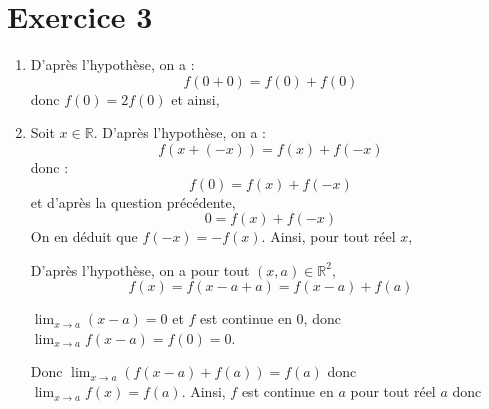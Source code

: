 \documentclass[a4paper,twoside,french,10pt]{VcCours}
\begin{document}
\medskip

\section*{Exercice 3}
\begin{enumerate}
\item D'après l'hypothèse, on a :
$$ f(0+0)=f(0)+f(0)$$
donc $f(0)=2f(0)$ et ainsi,
\item Soit $x \in \mathbb{R}$. D'après l'hypothèse, on a :
$$ f(x+(-x))=f(x)+f(-x)$$
donc :
$$ f(0) = f(x)+f(-x)$$
et d'après la question précédente,
$$ 0=f(x)+f(-x)$$
On en déduit que $f(-x)=-f(x)$. Ainsi, pour tout réel $x$,

D'après l'hypothèse, on a pour tout $(x, a) \in \mathbb{R}^2$,
$$ f(x)=f(x-a+a)=f(x-a)+f(a)$$

$\lim_{x\to a}(x-a)=0$ et $f$ est continue en $0$, donc $\lim_{x\to a}f(x-a)=f(0)=0$.

Donc $\lim_{x\to a}(f(x-a)+f(a))=f(a)$ donc $\lim_{x\to a}f(x)=f(a)$.
Ainsi, $f$ est continue en $a$ pour tout réel $a$ donc


\end{enumerate}
\end{document}
